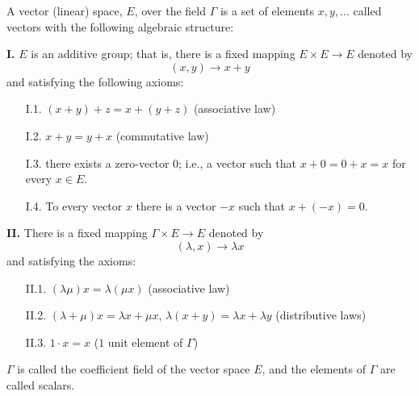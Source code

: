 A vector (linear) space, $E$, over the field $\Gamma$ is a set of elements $x, y, \ldots$ called vectors with the following algebraic structure:

\textbf{I.} $E$ is an additive group; that is, there is a fixed mapping $E \times E \rightarrow E$ denoted by
$$(x, y) \rightarrow x + y$$
and satisfying the following axioms:
\begin{itemize}
\item[I.1.] $(x + y) + z = x + (y + z)$ (associative law)
\item[I.2.] $x + y = y + x$ (commutative law)
\item[I.3.] there exists a zero-vector $0$; i.e., a vector such that $x + 0 = 0 + x = x$ for every $x \in E$.
\item[I.4.] To every vector $x$ there is a vector $-x$ such that $x + (-x) = 0$.
\end{itemize}

\textbf{II.} There is a fixed mapping $\Gamma \times E \rightarrow E$ denoted by
$$(\lambda, x) \rightarrow \lambda x$$
and satisfying the axioms:
\begin{itemize}
\item[II.1.] $(\lambda \mu)x = \lambda (\mu x)$ (associative law)
\item[II.2.] $(\lambda + \mu)x = \lambda x + \mu x$, \quad $\lambda(x + y) = \lambda x + \lambda y$ (distributive laws)
\item[II.3.] $1 \cdot x = x$ ($1$ unit element of $\Gamma$)
\end{itemize}

$\Gamma$ is called the coefficient field of the vector space $E$, and the elements of $\Gamma$ are called scalars.
